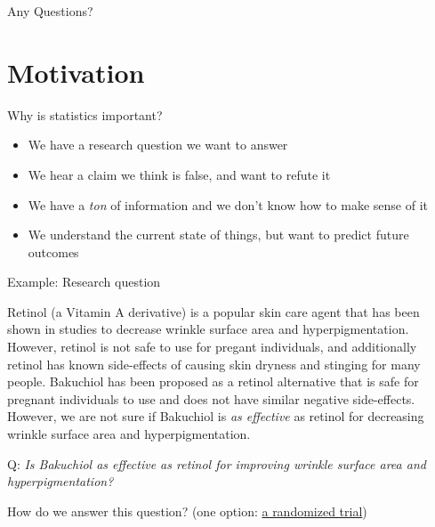 \documentclass[10pt,t]{beamer}
\begin{document}
\begin{frame}[c]
\centering \huge Any Questions?
\end{frame}

\section{Motivation}

\begin{frame}{Why is statistics important?}
\begin{itemize}
	\item We have a research question we want to answer
	\item We hear a claim we think is false, and want to refute it
	\item We have a \textit{ton} of information and we don't know how to make sense of it
	\item We understand the current state of things, but want to predict future outcomes
\end{itemize}
\end{frame}

\begin{frame}{Example: Research question}

Retinol (a Vitamin A derivative) is a popular skin care agent that has been shown in studies to decrease wrinkle surface area and hyperpigmentation. However, retinol is not safe to use for pregant individuals, and additionally retinol has known side-effects of causing skin dryness and stinging for many people. Bakuchiol has been proposed as a retinol alternative that is safe for pregnant individuals to use and does not have similar negative side-effects. However, we are not sure if Bakuchiol is \textit{as effective} as retinol for decreasing wrinkle surface area and hyperpigmentation. 

\vspace{0.3cm}

Q: \textit{Is Bakuchiol as effective as retinol for improving wrinkle surface area and hyperpigmentation?} 

\vspace{0.3cm}

How do we answer this question? (one option: \href{https://onlinelibrary.wiley.com/doi/10.1111/bjd.16918}{a randomized trial})

\end{frame}
\end{document}
